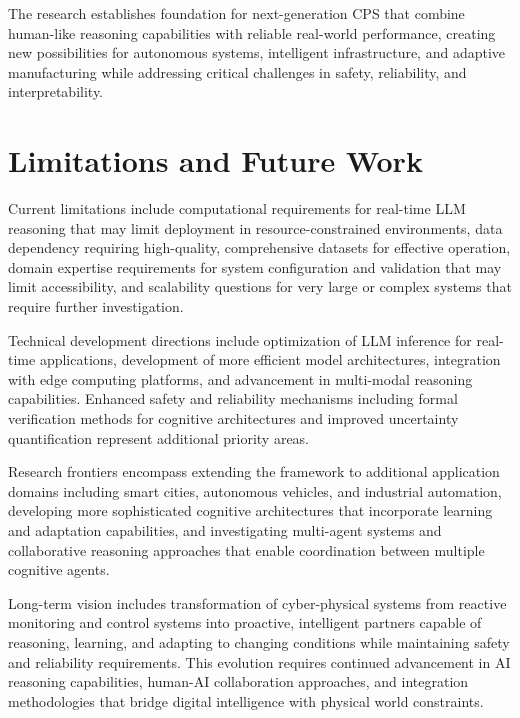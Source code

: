The research establishes foundation for next-generation CPS that combine human-like reasoning capabilities with reliable real-world performance, creating new possibilities for autonomous systems, intelligent infrastructure, and adaptive manufacturing while addressing critical challenges in safety, reliability, and interpretability.

\section{Limitations and Future Work}

Current limitations include computational requirements for real-time LLM reasoning that may limit deployment in resource-constrained environments, data dependency requiring high-quality, comprehensive datasets for effective operation, domain expertise requirements for system configuration and validation that may limit accessibility, and scalability questions for very large or complex systems that require further investigation.

Technical development directions include optimization of LLM inference for real-time applications, development of more efficient model architectures, integration with edge computing platforms, and advancement in multi-modal reasoning capabilities. Enhanced safety and reliability mechanisms including formal verification methods for cognitive architectures and improved uncertainty quantification represent additional priority areas.

Research frontiers encompass extending the framework to additional application domains including smart cities, autonomous vehicles, and industrial automation, developing more sophisticated cognitive architectures that incorporate learning and adaptation capabilities, and investigating multi-agent systems and collaborative reasoning approaches that enable coordination between multiple cognitive agents.

Long-term vision includes transformation of cyber-physical systems from reactive monitoring and control systems into proactive, intelligent partners capable of reasoning, learning, and adapting to changing conditions while maintaining safety and reliability requirements. This evolution requires continued advancement in AI reasoning capabilities, human-AI collaboration approaches, and integration methodologies that bridge digital intelligence with physical world constraints. 